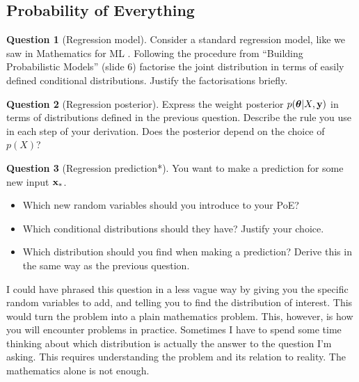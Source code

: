 \documentclass[a4paper]{article}
\theoremstyle{definition}
\newtheorem{question}{Question}
\begin{document}
\subsection{Probability of Everything}
\begin{question}[Regression model]
\label{q:poe-regression}
Consider a standard regression model, like we saw in Mathematics for ML \citep{mml}. Following the procedure from ``Building Probabilistic Models'' (slide 6) factorise the joint distribution in terms of easily defined conditional distributions. Justify the factorisations briefly.
\end{question}

\begin{question}[Regression posterior]
\label{q:poe-regression-posterior}
Express the weight posterior $p(\boldsymbol{\theta}|X, \mathbf{y})$ in terms of distributions defined in the previous question. Describe the rule you use in each step of your derivation. Does the posterior depend on the choice of $p(X)$?
\end{question}

\begin{question}[Regression prediction*]
\label{q:poe-regression-prediction} You want to make a prediction for some new input $\mathbf{x}_*$.
\begin{itemize}
\item Which new random variables should you introduce to your PoE?
\item Which conditional distributions should they have? Justify your choice.
\item Which distribution should you find when making a prediction? Derive this in the same way as the previous question.
\end{itemize}
\end{question}

I could have phrased this question in a less vague way by giving you the specific random variables to add, and telling you to find the distribution of interest. This would turn the problem into a plain mathematics problem. This, however, is how you will encounter problems in practice. Sometimes I have to spend some time thinking about which distribution is actually the answer to the question I'm asking. This requires understanding the problem and its relation to reality. The mathematics alone is not enough.
\end{document}
